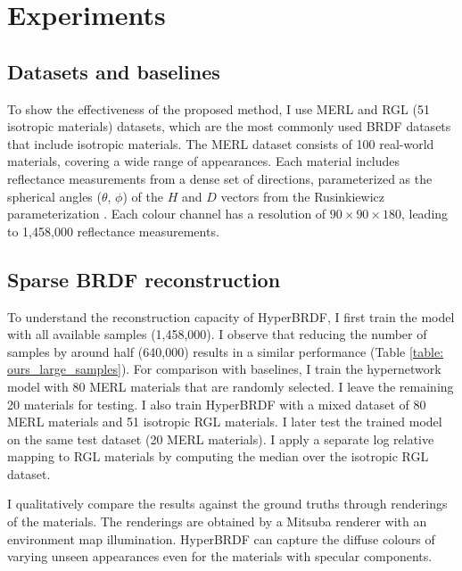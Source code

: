\section{Experiments}\label{sec:exp}


\subsection{Datasets and baselines}

To show the effectiveness of the proposed method, I use MERL \cite{Matusik2003jul} and RGL (51 isotropic materials) \cite{dupuy2018adaptive} datasets, which are the most commonly used \gls{BRDF} datasets that include isotropic materials. The MERL dataset \cite{Matusik2003jul} consists of 100 real-world materials, covering a wide range of appearances. Each material includes reflectance measurements from a dense set of directions, parameterized as the spherical angles ($\theta$, $\phi$) of the $H$ and $D$ vectors from the Rusinkiewicz parameterization \cite{rusinkiewicz1998new}. Each colour channel has a resolution of $90 \times 90 \times 180$, leading to 1,458,000 reflectance measurements. 



\subsection{Sparse BRDF reconstruction}\label{sec:brdf_rec}

To understand the reconstruction capacity of HyperBRDF, I first train the model with all available samples (1,458,000). I observe that reducing the number of samples by around half (640,000) results in a similar performance (Table \ref{table: ours_large_samples}). For comparison with baselines, I train the hypernetwork model with 80 MERL materials that are randomly selected. I leave the remaining 20 materials for testing. I also train HyperBRDF with a mixed dataset of 80 MERL materials and 51 isotropic RGL materials. I later test the trained model on the same test dataset (20 MERL materials). I apply a separate log relative mapping to RGL materials by computing the median over the isotropic RGL dataset.
 
I qualitatively compare the results against the ground truths through renderings of the materials. The renderings are obtained by a Mitsuba renderer with an environment map illumination. HyperBRDF can capture the diffuse colours of varying unseen appearances even for the materials with specular components. 


